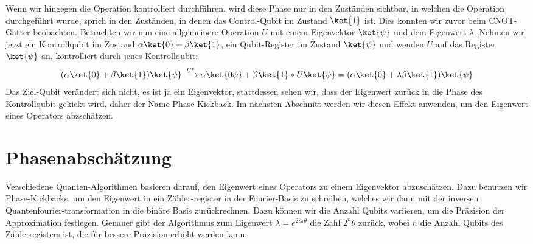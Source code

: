 Wenn wir hingegen die Operation kontrolliert durchführen, wird diese Phase nur in den Zuständen sichtbar, in welchen die Operation durchgeführt wurde, sprich in den Zuständen, in denen das Control-Qubit im Zustand $\ket{1}$ ist. Dies konnten wir zuvor beim CNOT-Gatter beobachten. Betrachten wir nun eine allgemeinere Operation $U$ mit einem Eigenvektor $\ket{\psi}$ und dem Eigenwert $\lambda$. Nehmen wir jetzt ein Kontrollqubit im Zustand $\alpha\ket{0} + \beta\ket{1}$, ein Qubit-Register im Zustand $\ket{\psi}$ und wenden $U$ auf das Register $\ket{\psi}$ an, kontrolliert durch jenes Kontrollqubit:
\begin{align*}
(\alpha\ket{0} + \beta\ket{1})\ket{\psi} \xrightarrow{U^c} \alpha\ket{0\psi} + \beta\ket{1}*U\ket{\psi} = (\alpha\ket{0} + \lambda\beta\ket{1})\ket{\psi}
\end{align*}
Das Ziel-Qubit verändert sich nicht, es ist ja ein Eigenvektor, stattdessen sehen wir, dass der Eigenwert zurück in die Phase des Kontrollqubit \grqq gekickt\grqq{} wird, daher der Name \grqq Phase Kickback\grqq{}. Im nächsten Abschnitt werden wir diesen Effekt anwenden, um den Eigenwert eines Operators abzschätzen.

\section{Phasenabschätzung}
Verschiedene Quanten-Algorithmen basieren darauf, den Eigenwert eines Operators zu einem Eigenvektor abzuschätzen. Dazu benutzen wir Phase-Kickbacks, um den Eigenwert in ein Zähler-register in der Fourier-Basis zu schreiben, welches wir dann mit der inversen Quantenfourier-transformation in die binäre Basis zurückrechnen. Dazu können wir die Anzahl Qubits variieren, um die Präzision der Approximation festlegen. Genauer gibt der Algorithmus zum Eigenwert $\lambda = e^{2i\pi\theta}$ die Zahl $2^n\theta$ zurück, wobei $n$ die Anzahl Qubits des Zählerregisters ist, die für bessere Präzision erhöht werden kann. 
